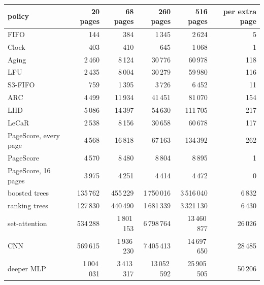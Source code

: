 \begin{tabular}{lrrrrr}
\toprule
policy & 20 pages & 68 pages & 260 pages & 516 pages & per extra page \\
\midrule
FIFO & 144 & 384 & 1\,345 & 2\,624 & 5 \\
Clock & 403 & 410 & 645 & 1\,068 & 1 \\
Aging & 2\,460 & 8\,124 & 30\,776 & 60\,978 & 118 \\
LFU & 2\,435 & 8\,004 & 30\,279 & 59\,980 & 116 \\
S3-FIFO & 759 & 1\,395 & 3\,726 & 6\,452 & 11 \\
ARC & 4\,499 & 11\,934 & 41\,451 & 81\,070 & 154 \\
LHD & 5\,086 & 14\,397 & 54\,630 & 111\,705 & 217 \\
LeCaR & 2\,538 & 8\,156 & 30\,658 & 60\,678 & 117 \\
PageScore, every page & 4\,568 & 16\,818 & 67\,163 & 134\,392 & 262 \\
PageScore & 4\,570 & 8\,480 & 8\,804 & 8\,895 & 1 \\
PageScore, 16 pages & 3\,975 & 4\,251 & 4\,414 & 4\,472 & 0 \\
boosted trees & 135\,762 & 455\,229 & 1\,750\,016 & 3\,516\,040 & 6\,832 \\
ranking trees & 127\,830 & 440\,490 & 1\,681\,339 & 3\,321\,130 & 6\,430 \\
set-attention & 534\,288 & 1\,801\,153 & 6\,798\,764 & 13\,460\,877 & 26\,026 \\
CNN & 569\,615 & 1\,936\,230 & 7\,405\,413 & 14\,697\,650 & 28\,485 \\
deeper MLP & 1\,004\,031 & 3\,413\,317 & 13\,052\,592 & 25\,905\,505 & 50\,206 \\
\bottomrule
\end{tabular}
